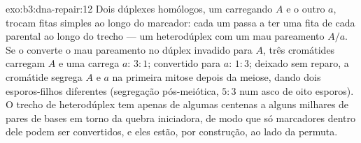 \begin{solution}{exo:b3:dna-repair:12}
Dois dúplexes homólogos, um carregando $A$ e o outro $a$, trocam fitas
simples ao longo do marcador: cada um passa a ter uma fita de cada
parental ao longo do trecho --- um heterodúplex com um mau pareamento
$A/a$. Se o  converte o mau pareamento no
dúplex invadido para $A$, três cromátides carregam $A$ e uma carrega
$a$: $3{:}1$; convertido para $a$: $1{:}3$; deixado sem reparo, a
cromátide segrega $A$ e $a$ na primeira mitose depois da meiose, dando
dois esporos-filhos diferentes (segregação pós-meiótica, $5{:}3$ num
asco de oito esporos). O trecho de heterodúplex tem apenas de algumas
centenas a alguns milhares de pares de bases em torno da quebra
iniciadora, de modo que só marcadores dentro dele podem ser
convertidos, e eles estão, por construção, ao lado da permuta.
\end{solution}

